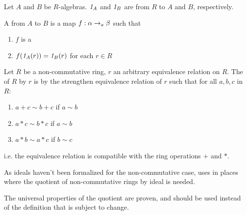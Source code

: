\begin{definition}
    \label{AlgHom}
    \leanok

    Let $A$ and $B$ be $R$-algebras. $\mathit{1}_A$ and $\mathit{1}_B$ are  from $R$ to $A$ and $B$, respectively.

    A  from $A$ to $B$ is a map $f : \alpha \to_{a} \beta$ such that

    \begin{enumerate}

    \item $f$ is a 

    \item $f(\mathit{1}_{A}(r)) = \mathit{1}_{B}(r)$ for each $r \in R$

    \end{enumerate}

\end{definition}

\begin{definition}
    \label{RingQuot}
    \leanok

    Let $R$ be a non-commutative ring, $r$ an arbitrary equivalence relation on $R$.
    The  of $R$ by $r$
    is by the strengthen equivalence relation of $r$ such that for all $a, b, c$ in $R$:

    \begin{enumerate}

    \item $a + c \sim b + c$ if $a \sim b$
    \item $a * c \sim b * c$ if $a \sim b$
    \item $a * b \sim a * c$ if $b \sim c$
    
    \end{enumerate}

    i.e. the equivalence relation is compatible with the ring operations $+$ and $*$.

\end{definition}

\begin{remark}
    \label{mk:RingQuot}

    As ideals haven't been formalized for the non-commutative case, \Mathlib uses  in places
    where the quotient of non-commutative rings by ideal is needed.

    The universal properties of the quotient are proven, and should be used instead of the definition that is subject to change.
    
\end{remark}

